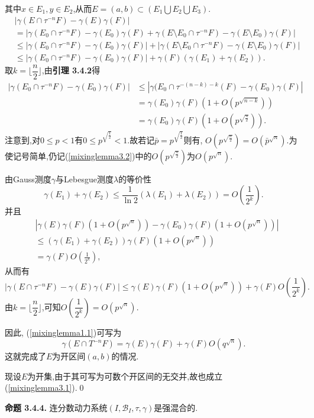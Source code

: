 其中$x\in E_1,y\in E_2$,从而$E=(a,b)\subset(E_1\bigcup E_2\bigcup E_3)$.
\begin{align*}
     & \left|\gamma(E\cap \tau^{-n}F)-\gamma(E)\gamma(F)\right|                                                                                                  \\
     & =\left|\gamma(E_0\cap \tau^{-n}F)-\gamma(E_0)\gamma(F)+\gamma(E\setminus E_0 \cap \tau^{-n}F)-\gamma(E\setminus E_0)\gamma(F)\right|                      \\
     & \leqslant\left|\gamma(E_0\cap \tau^{-n}F)-\gamma(E_0)\gamma(F)\right|+\left|\gamma(E\setminus E_0 \cap \tau^{-n}F)-\gamma(E\setminus E_0)\gamma(F)\right| \\
     & \leqslant\left|\gamma(E_0\cap \tau^{-n}F)-\gamma(E_0)\gamma(F)\right|+\gamma(F)(\gamma(E_1)+\gamma(E_2)).
\end{align*}
取$k=\lfloor \dfrac{n}{2}\rfloor$,由\textbf{引理 3.4.2}得
\begin{equation}\label{mixinglemma3.2}
    \begin{aligned}
        \left|\gamma(E_0\cap \tau^{-n}F)-\gamma(E_0)\gamma(F)\right| & \leqslant\left|\gamma(E_0\cap \tau^{-(n-k)-k}(F)-\gamma(E_0)\gamma(F)\right| \\
                                                                     & =\gamma(E_0)\gamma(F)(1+O(p^{\sqrt{n-k}}))                                   \\
                                                                     & =\gamma(E_0)\gamma(F)(1+O(p^{\sqrt{\frac{n}{2}}})).
    \end{aligned}
\end{equation}
注意到,对$0\leqslant p<1$有$0\leqslant p^{\sqrt{\frac{1}{2}}}<1$.故若记$\bar{p}=p^{\sqrt{\frac{1}{2}}}$则有, $O(p^{\sqrt{\frac{n}{2}}})=O(\bar{p}^{\sqrt{n}})$.为使记号简单,仍记(\ref{mixinglemma3.2})中的$O(p^{\sqrt{\frac{n}{2}}})$为$O(p^{\sqrt{n}})$.\par
由Gauss测度$\gamma$与Lebesgue测度$\lambda$的等价性$$\gamma(E_1)+\gamma(E_2)\leqslant\frac{1}{\ln2}(\lambda(E_1)+\lambda(E_2))=O(\frac{1}{2^{k}}).$$
并且
\begin{align*}
     & \left|\gamma(E)\gamma(F)(1+O(p^{\sqrt{n}}))-\gamma(E_0)\gamma(F)(1+O(p^{\sqrt{n}}))\right| \\
     & \leqslant(\gamma(E_1)+\gamma(E_2))\gamma(F)(1+O(p^{\sqrt{n}}))                             \\
     & =\gamma(F)O(\frac{1}{2^{k}}),
\end{align*}
从而有
$$\left|\gamma(E\cap \tau^{-n}F)-\gamma(E)\gamma(F)\right|\leqslant\gamma(E)\gamma(F)(1+O(p^{\sqrt{n}}))+\gamma(F)O(\frac{1}{2^{k}}).$$
由$k=\lfloor \dfrac{n}{2}\rfloor$,可知$O(\dfrac{1}{2^{k}})=O(p^{\sqrt{n}})$.\par
因此, (\ref{mixinglemma1.1})可写为
$$\gamma(E\cap T^{-n}F)=\gamma(E)\gamma(F)+\gamma(F)O(q^{\sqrt{n}}).$$
这就完成了$E$为开区间$(a,b)$的情况.\par
现设$E$为开集,由于其可写为可数个开区间的无交并,故也成立(\ref{mixinglemma3.1}).\qed
\par
\textbf{命题 3.4.4.}\textsuperscript{\cite{Liu_Peng,Mixing_lemma}}
连分数动力系统$(I,\mathcal{B}_I,\tau,\gamma)$是强混合的.
\par

